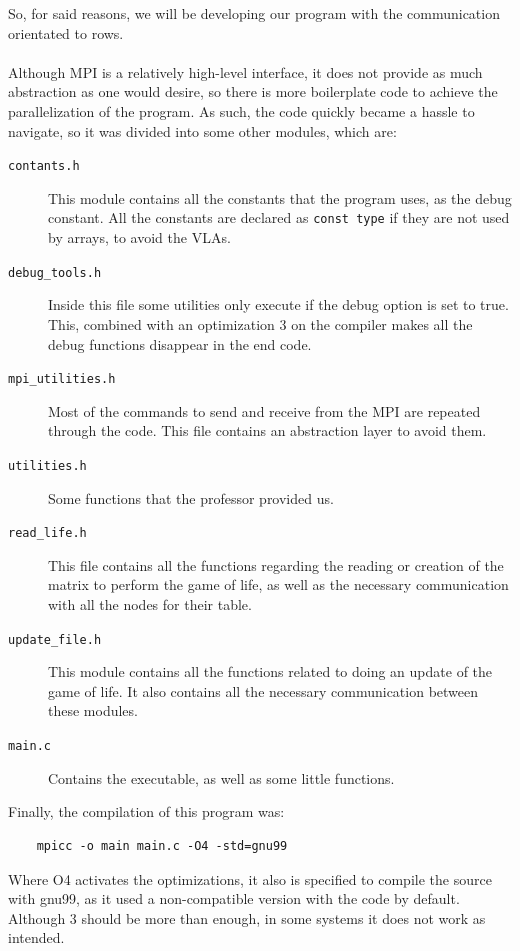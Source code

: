 \documentclass[11pt, a4paper]{article}
\begin{document}
So, for said reasons, we will be developing our program with the communication orientated to rows.\\
\\
Although MPI is a relatively high-level interface, it does not provide as much abstraction as one would desire, so there is more boilerplate code to achieve the parallelization of the program. As such, the code quickly became a hassle to navigate, so it was divided into some other modules, which are:
\begin{description}
	\item[\texttt{contants.h}] This module contains all the constants that the program uses, as the debug constant. All the constants are declared as \texttt{const type} if they are not used by arrays, to avoid the VLAs.
	
	\item[\texttt{debug\_tools.h}] Inside this file some utilities only execute if the debug option is set to true. This, combined with an optimization 3 on the compiler makes all the debug functions disappear in the end code.
	
	\item[\texttt{mpi\_utilities.h}] Most of the commands to send and receive from the MPI are repeated through the code. This file contains an abstraction layer to avoid them.
	
	\item[\texttt{utilities.h}] Some functions that the professor provided us.
	
	\item[\texttt{read\_life.h}] This file contains all the functions regarding the reading or creation of the matrix to perform the game of life, as well as the necessary communication with all the nodes for their table.
	
	\item[\texttt{update\_file.h}] This module contains all the functions related to doing an update of the game of life. It also contains all the necessary communication between these modules.
	
	\item[\texttt{main.c}] Contains the executable, as well as some little functions.
\end{description} 
\vspace{0.75cm}

Finally, the compilation of this program was:
\begin{verbatim}
	mpicc -o main main.c -O4 -std=gnu99
\end{verbatim}
Where O4 activates the optimizations, it also is specified to compile the source with gnu99, as it used a non-compatible version with the code by default. Although 3 should be more than enough, in some systems it does not work as intended. 
\end{document}
